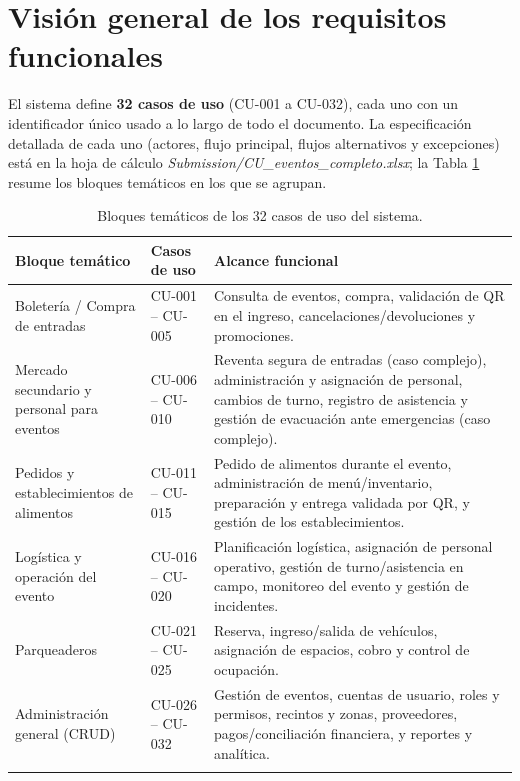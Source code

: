 \documentclass[11pt,a4paper]{article}
\begin{document}
\section{Visión general de los requisitos funcionales}
\label{sec:reqs}

El sistema define \textbf{32 casos de uso} (CU-001 a CU-032), cada uno con un identificador único
usado a lo largo de todo el documento. La especificación detallada de cada uno (actores, flujo
principal, flujos alternativos y excepciones) está en la hoja de cálculo
\textit{Submission/CU\_eventos\_completo.xlsx}; la Tabla \ref{tab:cu-bloques} resume los bloques
temáticos en los que se agrupan.

\begin{center}
\begin{longtable}{p{3.4cm}p{2.6cm}p{8.5cm}}
\toprule
\textbf{Bloque temático} & \textbf{Casos de uso} & \textbf{Alcance funcional}\\
\midrule
\endhead
Boletería / Compra de entradas & CU-001 -- CU-005 & Consulta de eventos, compra, validación de QR
en el ingreso, cancelaciones/devoluciones y promociones.\\[0.3em]
Mercado secundario y personal para eventos & CU-006 -- CU-010 & Reventa segura de entradas
(caso complejo), administración y asignación de personal, cambios de turno, registro de
asistencia y gestión de evacuación ante emergencias (caso complejo).\\[0.3em]
Pedidos y establecimientos de alimentos & CU-011 -- CU-015 & Pedido de alimentos durante el
evento, administración de menú/inventario, preparación y entrega validada por QR, y gestión de
los establecimientos.\\[0.3em]
Logística y operación del evento & CU-016 -- CU-020 & Planificación logística, asignación de
personal operativo, gestión de turno/asistencia en campo, monitoreo del evento y gestión de
incidentes.\\[0.3em]
Parqueaderos & CU-021 -- CU-025 & Reserva, ingreso/salida de vehículos, asignación de espacios,
cobro y control de ocupación.\\[0.3em]
Administración general (CRUD) & CU-026 -- CU-032 & Gestión de eventos, cuentas de usuario, roles
y permisos, recintos y zonas, proveedores, pagos/conciliación financiera, y reportes y
analítica.\\
\bottomrule
\caption{Bloques temáticos de los 32 casos de uso del sistema.}
\label{tab:cu-bloques}
\end{longtable}
\end{center}
\end{document}
